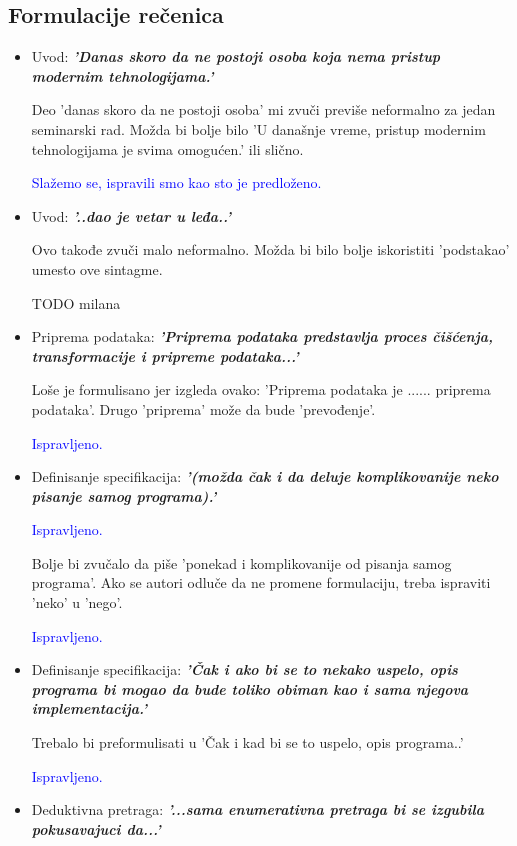 \documentclass[a4paper]{report}
\newcommand{\odgovor}[1]{\textcolor{blue}{#1}}
\begin{document}
\subsection{Formulacije rečenica}
\begin{itemize}
	\item Uvod: \textbf{\textit{'Danas skoro da ne postoji osoba koja nema pristup modernim tehnologijama.'}}

	Deo 'danas skoro da ne postoji osoba' mi zvuči previše neformalno za jedan seminarski rad. Možda bi bolje bilo 'U današnje vreme, pristup modernim tehnologijama je svima omogućen.' ili slično.

	\odgovor {Slažemo se, ispravili smo kao sto je predloženo.}

	\item Uvod: \textbf{\textit{'..dao je vetar u leđa..'}}

    Ovo takođe zvuči malo neformalno. Možda bi bilo bolje iskoristiti 'podstakao' umesto ove sintagme.

	TODO milana

    \item Priprema podataka: \textbf{\textit{'Priprema podataka predstavlja proces čišćenja, transformacije i pripreme podataka...'}}

    Loše je formulisano jer izgleda ovako: 'Priprema podataka je ...... priprema podataka'. Drugo 'priprema' može da bude 'prevođenje'.

    \odgovor{Ispravljeno.}

    \item Definisanje specifikacija: \textbf{\textit{'(možda čak i da deluje komplikovanije neko pisanje samog programa).'}}

    \odgovor {Ispravljeno.}

    Bolje bi zvučalo da piše 'ponekad i komplikovanije od pisanja samog programa'. Ako se autori odluče da ne promene formulaciju, treba ispraviti 'neko' u 'nego'.

    \odgovor {Ispravljeno.}

    \item Definisanje specifikacija: \textbf{\textit{'Čak i ako bi se to nekako uspelo, opis programa bi mogao da bude toliko obiman kao i sama njegova implementacija.'}}

    Trebalo bi preformulisati u 'Čak i kad bi se to uspelo, opis programa..'

    \odgovor {Ispravljeno.}

    \item Deduktivna pretraga: \textbf{\textit{'...sama enumerativna pretraga bi se izgubila pokusavajuci da...'}}


\end{itemize}
\end{document}
